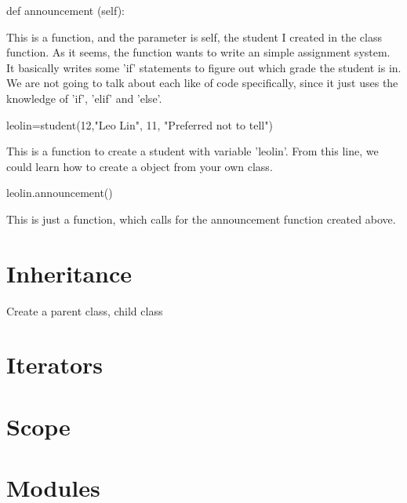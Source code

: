 \documentclass[12pt]{article}
\begin{document}
\begin{python}
	def announcement (self):
\end{python}
\par This is a function, and the parameter is self, the student I created in the class function.
As it seems, the function wants to write an simple assignment system.
It basically writes some 'if' statements to figure out which grade the student is in. We are not going to talk about each like of code specifically, since it just uses the knowledge of 'if', 'elif' and 'else'.
\begin{python}
	leolin=student(12,"Leo Lin", 11, "Preferred not to tell")
\end{python}
\par This is a function to create a student with variable 'leolin'.
From this line, we could learn how to create a object from your own class.
\begin{python}
	leolin.announcement()
\end{python}
This is just a function, which calls for the announcement function created above.
\section{Inheritance}
Create a parent class, child class
\section{Iterators}
\section{Scope}
\section{Modules}

\printbibliography
\end{document}
